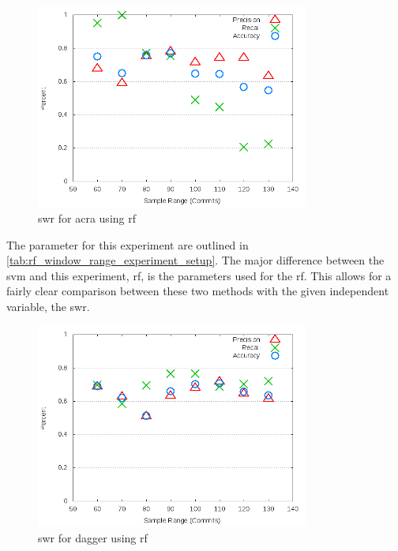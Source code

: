 \begin{figure}[!t]
    \centering
        \includegraphics[width=0.8\textwidth]{images/rf/test_1/acra_sample_range}
        \caption{\gls{swr} for acra using \gls{rf}}
        \label{fig:test_1_acra_rf}
\end{figure}

The parameter for this experiment are outlined in \autoref{tab:rf_window_range_experiment_setup}. The major difference between the \gls{svm} and this experiment, \gls{rf}, is the parameters used for the \gls{rf}. This allows for a fairly clear comparison between these two methods with the given independent variable, the \gls{swr}.

\begin{figure}[!ht]
    \centering
        \includegraphics[width=0.8\textwidth]{images/rf/test_1/dagger_sample_range}
        \caption{\gls{swr} for dagger using \gls{rf}}
        \label{fig:test_1_dagger_rf}
\end{figure}


